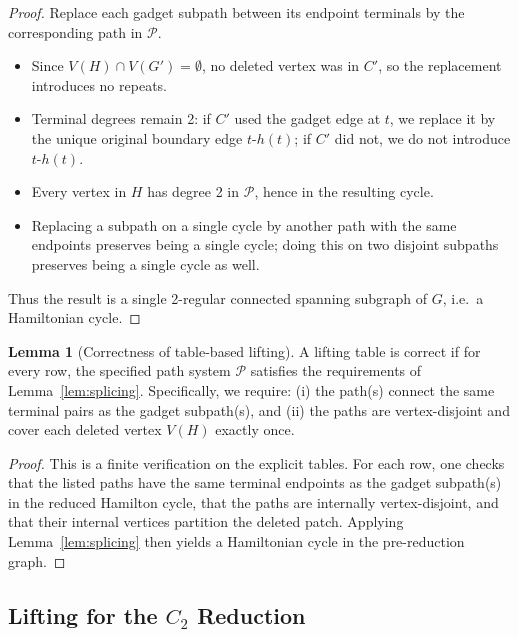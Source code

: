 \documentclass[12pt]{article}
\theoremstyle{definition}
\newtheorem{lemma}[theorem]{Lemma}
\begin{document}
\begin{proof}
Replace each gadget subpath between its endpoint terminals by the corresponding path in $\mathcal{P}$.

\begin{itemize}
    \item Since $V(H) \cap V(G') = \emptyset$, no deleted vertex was in $C'$, so the replacement introduces no repeats.
    \item Terminal degrees remain 2: if $C'$ used the gadget edge at $t$, we replace it by the unique original boundary edge $t$-$h(t)$; if $C'$ did not, we do not introduce $t$-$h(t)$.
    \item Every vertex in $H$ has degree 2 in $\mathcal{P}$, hence in the resulting cycle.
    \item Replacing a subpath on a single cycle by another path with the same endpoints preserves being a single cycle; doing this on two disjoint subpaths preserves being a single cycle as well.
\end{itemize}

Thus the result is a single 2-regular connected spanning subgraph of $G$, i.e.\ a Hamiltonian cycle.
\end{proof}

\begin{lemma}[Correctness of table-based lifting]
\label{lem:table-correctness}
A lifting table is correct if for every row, the specified path system $\mathcal{P}$ satisfies the requirements of Lemma~\ref{lem:splicing}. Specifically, we require:
(i) the path(s) connect the same terminal pairs as the gadget subpath(s), and
(ii) the paths are vertex-disjoint and cover each deleted vertex $V(H)$ exactly once.
\end{lemma}

\begin{proof}
This is a finite verification on the explicit tables.
For each row, one checks that the listed paths have the same terminal endpoints as the gadget subpath(s) in the reduced Hamilton cycle, that the paths are internally vertex-disjoint, and that their internal vertices partition the deleted patch.
Applying Lemma~\ref{lem:splicing} then yields a Hamiltonian cycle in the pre-reduction graph.
\end{proof}

\subsection{Lifting for the \texorpdfstring{$C_2$}{C2} Reduction}
\label{subsec:lifting-c2}
\end{document}
